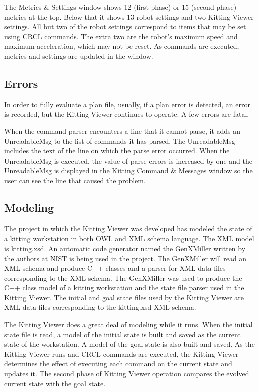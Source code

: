The Metrics \& Settings window shows 12 (first phase) or 15 (second phase)
metrics at the top. Below that it shows 13 robot settings and two
Kitting Viewer settings. All but two of the robot settings correspond to
items that may be set using CRCL commands. The extra two are the
robot\rq{}s maximum speed and maximum acceleration, which may not be
reset. As commands are executed, metrics and settings are updated in the
window.

\subsection{Errors}
In order to fully evaluate a plan file, usually, if a plan error is
detected, an error is recorded, but the Kitting Viewer continues to operate.
A few errors are fatal.
  
When the command parser encounters a line that it cannot parse, it adds
an \sf UnreadableMsg \rm to the list of commands it has parsed. The \sf
UnreadableMsg \rm includes the text of the line on which the parse error
occurred. When the \sf UnreadableMsg \rm is executed, the value of parse
errors is increased by one and the \sf UnreadableMsg \rm is displayed in
the Kitting Command \& Messages window so the user can see the line that
caused the problem.

\subsection{Modeling}
The project in which the Kitting Viewer was developed has modeled the state
of a kitting workstation in both OWL and XML schema language. The XML model
is kitting.xsd. An automatic code generator named the GenXMiller written by
the authors at NIST is being used in the project. The GenXMiller will read
an XML schema and produce C++ classes and a parser for XML data files
corresponding to the XML schema. The GenXMiller was used to produce the C++
class model of a kitting workstation and the state file parser used in the
Kitting Viewer. The initial and goal state files used by the Kitting Viewer
are XML data files corresponding to the kitting.xsd XML schema.

The Kitting Viewer does a great deal of modeling while it runs. When the
initial state file is read, a model of the initial state is built and saved
as the current state of the workstation. A model of the goal state is also
built and saved. As the Kitting Viewer runs and CRCL commands are executed,
the Kitting Viewer determines the effect of executing each command on the
current state and updates it. The second phase of Kitting Viewer operation
compares the evolved current state with the goal state.

